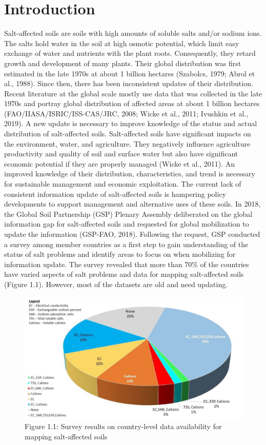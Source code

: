 \documentclass[
  10pt,
  b5paper,
]{book}
\begin{document}
\hypertarget{introduction}{%
\chapter{Introduction}\label{introduction}}

Salt-affected soils are soils with high amounts of soluble salts and/or sodium ions. The salts hold water in the soil at high osmotic potential, which limit easy exchange of water and nutrients with the plant roots. Consequently, they retard growth and development of many plants. Their global distribution was first estimated in the late 1970s at about 1 billion hectares (Szabolcs, 1979; Abrol et al., 1988). Since then, there has been inconsistent updates of their distribution. Recent literature at the global scale mostly use data that was collected in the late 1970s and portray global distribution of affected areas at about 1 billion hectares (FAO/IIASA/ISRIC/ISS-CAS/JRC, 2008; Wicke et al., 2011; Ivushkin et al., 2019). A new update is necessary to improve knowledge of the status and actual distribution of salt-affected soils.
Salt-affected soils have significant impacts on the environment, water, and agriculture. They negatively influence agriculture productivity and quality of soil and surface water but also have significant economic potential if they are properly managed (Wicke et al., 2011). An improved knowledge of their distribution, characteristics, and trend is necessary for sustainable management and economic exploitation. The current lack of consistent information update of salt-affected soils is hampering policy developments to support management and alternative uses of these soils. In 2018, the Global Soil Partnership (GSP) Plenary Assembly deliberated on the global information gap for salt-affected soils and requested for global mobilization to update the information (GSP-FAO, 2018). Following the request, GSP conducted a survey among member countries as a first step to gain understanding of the status of salt problems and identify areas to focus on when mobilizing for information update. The survey revealed that more than 70\% of the countries have varied aspects of salt problems and data for mapping salt-affected soils (Figure 1.1). However, most of the datasets are old and need updating.

\begin{figure}
\centering
\includegraphics{figures/images/Figure1.1.jpg}
\caption{Figure 1.1: Survey results on country-level data availability for mapping salt-affected soils}
\end{figure}
\end{document}
